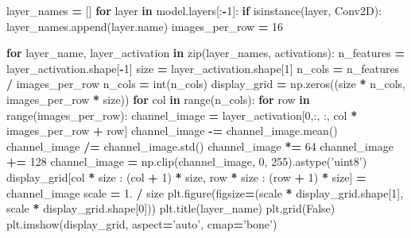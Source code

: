 \documentclass[]{book}
\newenvironment{Shaded}{\begin{snugshade}}{\end{snugshade}}
\newcommand{\KeywordTok}[1]{\textcolor[rgb]{0.13,0.29,0.53}{\textbf{#1}}}
\newcommand{\DecValTok}[1]{\textcolor[rgb]{0.00,0.00,0.81}{#1}}
\newcommand{\StringTok}[1]{\textcolor[rgb]{0.31,0.60,0.02}{#1}}
\newcommand{\VariableTok}[1]{\textcolor[rgb]{0.00,0.00,0.00}{#1}}
\newcommand{\ControlFlowTok}[1]{\textcolor[rgb]{0.13,0.29,0.53}{\textbf{#1}}}
\newcommand{\OperatorTok}[1]{\textcolor[rgb]{0.81,0.36,0.00}{\textbf{#1}}}
\newcommand{\BuiltInTok}[1]{#1}
\newcommand{\NormalTok}[1]{#1}
\theoremstyle{definition}
\theoremstyle{definition}
\theoremstyle{definition}
\theoremstyle{remark}
\begin{document}
\begin{Shaded}
\begin{Highlighting}[]
\NormalTok{layer_names }\OperatorTok{=}\NormalTok{ []}
\ControlFlowTok{for}\NormalTok{ layer }\KeywordTok{in}\NormalTok{ model.layers[:}\OperatorTok{-}\DecValTok{1}\NormalTok{]:}
    \ControlFlowTok{if} \BuiltInTok{isinstance}\NormalTok{(layer, Conv2D):}
\NormalTok{        layer_names.append(layer.name)}
\NormalTok{images_per_row }\OperatorTok{=} \DecValTok{16}

\ControlFlowTok{for}\NormalTok{ layer_name, layer_activation }\KeywordTok{in} \BuiltInTok{zip}\NormalTok{(layer_names, activations):}
\NormalTok{    n_features }\OperatorTok{=}\NormalTok{ layer_activation.shape[}\OperatorTok{-}\DecValTok{1}\NormalTok{]}
\NormalTok{    size }\OperatorTok{=}\NormalTok{ layer_activation.shape[}\DecValTok{1}\NormalTok{]}
\NormalTok{    n_cols }\OperatorTok{=}\NormalTok{ n_features }\OperatorTok{/}\NormalTok{ images_per_row}
\NormalTok{    n_cols }\OperatorTok{=} \BuiltInTok{int}\NormalTok{(n_cols)}
\NormalTok{    display_grid }\OperatorTok{=}\NormalTok{ np.zeros((size }\OperatorTok{*}\NormalTok{ n_cols, images_per_row }\OperatorTok{*}\NormalTok{ size))}
    \ControlFlowTok{for}\NormalTok{ col }\KeywordTok{in} \BuiltInTok{range}\NormalTok{(n_cols):}
        \ControlFlowTok{for}\NormalTok{ row }\KeywordTok{in} \BuiltInTok{range}\NormalTok{(images_per_row):}
\NormalTok{            channel_image }\OperatorTok{=}\NormalTok{ layer_activation[}\DecValTok{0}\NormalTok{,:, :, col }\OperatorTok{*}\NormalTok{ images_per_row }\OperatorTok{+}\NormalTok{ row]}
\NormalTok{            channel_image }\OperatorTok{-=}\NormalTok{ channel_image.mean()}
\NormalTok{            channel_image }\OperatorTok{/=}\NormalTok{ channel_image.std()}
\NormalTok{            channel_image }\OperatorTok{*=} \DecValTok{64}
\NormalTok{            channel_image }\OperatorTok{+=} \DecValTok{128}
\NormalTok{            channel_image }\OperatorTok{=}\NormalTok{ np.clip(channel_image, }\DecValTok{0}\NormalTok{, }\DecValTok{255}\NormalTok{).astype(}\StringTok{'uint8'}\NormalTok{)}
\NormalTok{            display_grid[col }\OperatorTok{*}\NormalTok{ size : (col }\OperatorTok{+} \DecValTok{1}\NormalTok{) }\OperatorTok{*}\NormalTok{ size,}
\NormalTok{                         row }\OperatorTok{*}\NormalTok{ size : (row }\OperatorTok{+} \DecValTok{1}\NormalTok{) }\OperatorTok{*}\NormalTok{ size] }\OperatorTok{=}\NormalTok{ channel_image}
\NormalTok{    scale }\OperatorTok{=} \DecValTok{1}\NormalTok{. }\OperatorTok{/}\NormalTok{ size}
\NormalTok{    plt.figure(figsize}\OperatorTok{=}\NormalTok{(scale }\OperatorTok{*}\NormalTok{ display_grid.shape[}\DecValTok{1}\NormalTok{],}
\NormalTok{                        scale }\OperatorTok{*}\NormalTok{ display_grid.shape[}\DecValTok{0}\NormalTok{]))}
\NormalTok{    plt.title(layer_name)}
\NormalTok{    plt.grid(}\VariableTok{False}\NormalTok{)}
\NormalTok{    plt.imshow(display_grid, aspect}\OperatorTok{=}\StringTok{'auto'}\NormalTok{, cmap}\OperatorTok{=}\StringTok{'bone'}\NormalTok{)}
\end{Highlighting}
\end{Shaded}
\end{document}
